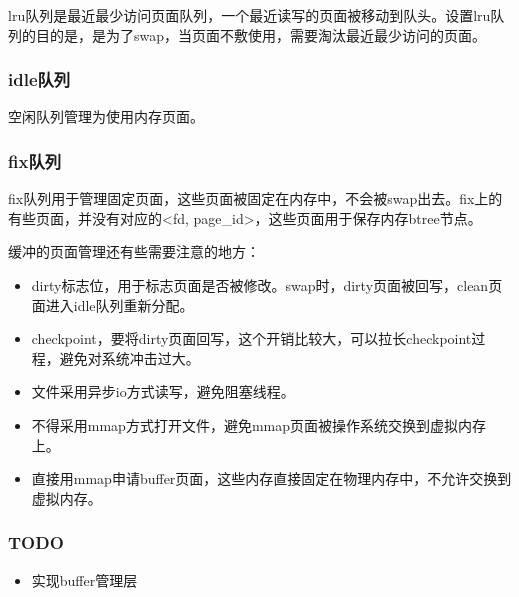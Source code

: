 \documentclass{article}
\begin{document}
lru队列是最近最少访问页面队列，一个最近读写的页面被移动到队头。设置lru队列的目的是，是为了swap，当页面不敷使用，需要淘汰最近最少访问的页面。

\subsubsection*{idle队列}

空闲队列管理为使用内存页面。

\subsubsection*{fix队列}

fix队列用于管理固定页面，这些页面被固定在内存中，不会被swap出去。fix上的有些页面，并没有对应的<fd, page\_id>，这些页面用于保存内存btree节点。

缓冲的页面管理还有些需要注意的地方：
\begin{itemize}
    \item dirty标志位，用于标志页面是否被修改。swap时，dirty页面被回写，clean页面进入idle队列重新分配。
    \item checkpoint，要将dirty页面回写，这个开销比较大，可以拉长checkpoint过程，避免对系统冲击过大。
    \item 文件采用异步io方式读写，避免阻塞线程。
    \item 不得采用mmap方式打开文件，避免mmap页面被操作系统交换到虚拟内存上。
    \item 直接用mmap申请buffer页面，这些内存直接固定在物理内存中，不允许交换到虚拟内存。
\end{itemize}

\subsubsection{TODO}

\begin{itemize}
    \item 实现buffer管理层
\end{itemize}

\printbibliography

\appendix
\end{document}
